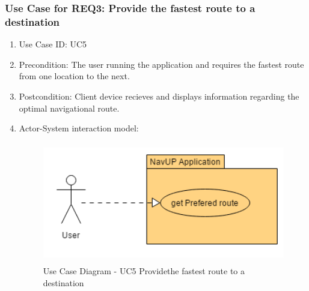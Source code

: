 \documentclass{article}
\begin{document}
		\subsubsection{Use Case for REQ3: Provide the fastest route to a destination}
			\begin{enumerate}
			\renewcommand{\labelenumi}{{\textbf{\arabic{enumi}.}}}
			\item Use Case ID: UC5
			\item Precondition: The user running the application and requires the fastest route from one location to the next.
			\item Postcondition: Client device recieves and displays information regarding the optimal navigational route.
			\item Actor-System interaction model:
				\graphicspath{ {./Diagrams/User/} }
				\begin{figure}[h]
				\caption{Use Case Diagram - UC5  Providethe fastest route to a destination}
				\includegraphics[height = 200px]{getPreferedRoute.png}
		\end{figure}
			\end{enumerate}
\end{document}
